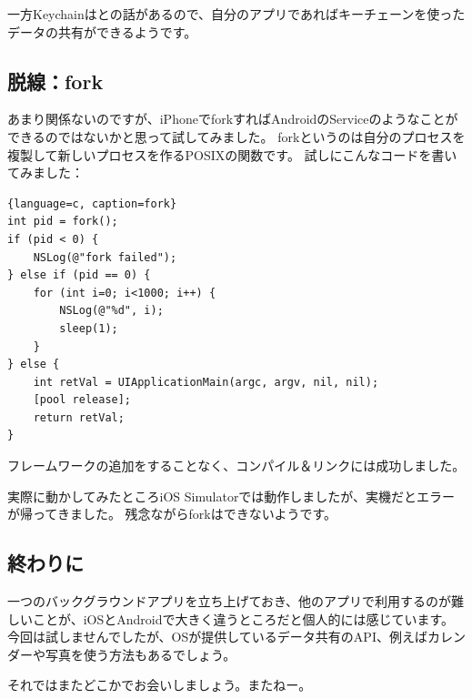 一方Keychainはとの話があるので、自分のアプリであればキーチェーンを使ったデータの共有ができるようです。

\subsection{脱線：fork}
あまり関係ないのですが、iPhoneでforkすればAndroidのServiceのようなことができるのではないかと思って試してみました。
forkというのは自分のプロセスを複製して新しいプロセスを作るPOSIXの関数です。
試しにこんなコードを書いてみました：
\begin{lstlisting}{language=c, caption=fork}
int pid = fork();
if (pid < 0) {
	NSLog(@"fork failed");
} else if (pid == 0) {
	for (int i=0; i<1000; i++) {
		NSLog(@"%d", i);
		sleep(1);
	}
} else {
	int retVal = UIApplicationMain(argc, argv, nil, nil);
	[pool release];
	return retVal;
}
\end{lstlisting}
フレームワークの追加をすることなく、コンパイル＆リンクには成功しました。

実際に動かしてみたところiOS Simulatorでは動作しましたが、実機だとエラーが帰ってきました。
残念ながらforkはできないようです。

\subsection{終わりに}
一つのバックグラウンドアプリを立ち上げておき、他のアプリで利用するのが難しいことが、iOSとAndroidで大きく違うところだと個人的には感じています。
今回は試しませんでしたが、OSが提供しているデータ共有のAPI、例えばカレンダーや写真を使う方法もあるでしょう。

それではまたどこかでお会いしましょう。またねー。
